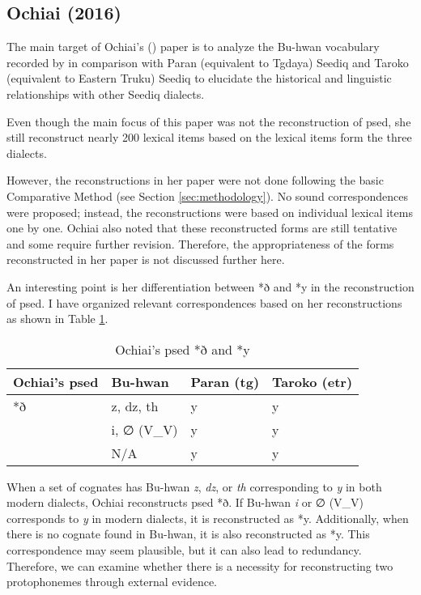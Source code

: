 \subsection{Ochiai (2016)}

The main target of Ochiai's (\citeyear{ochiai2016buhwan}) paper is to analyze the Bu-hwan vocabulary recorded by \textcite{bullock1874formosan} in comparison with Paran (equivalent to Tgdaya) Seediq and Taroko (equivalent to Eastern Truku) Seediq to elucidate the historical and linguistic relationships with other Seediq dialects.

Even though the main focus of this paper was not the reconstruction of \acl{psed}, she still reconstruct nearly 200 lexical items based on the lexical items form the three dialects.

However, the reconstructions in her paper were not done following the basic Comparative Method (see Section \ref{sec:methodology}). No sound correspondences were proposed; instead, the reconstructions were based on individual lexical items one by one. Ochiai also noted that these reconstructed forms are still tentative and some require further revision. Therefore, the appropriateness of the forms reconstructed in her paper is not discussed further here.

An interesting point is her differentiation between *ð and *y in the reconstruction of \acl{psed}. I have organized relevant correspondences based on her reconstructions as shown in Table \ref{tab:ochipsedzy}.

\begin{table}[!htbp]
\centering
\caption{Ochiai's \acl{psed} *ð and *y}
\label{tab:ochipsedzy}
\begin{tabular}{llll}
\hline
Ochiai's \acl{psed} & Bu-hwan    & Paran (\ac{tg}) & Taroko (\ac{etr}) \\ \hline
*ð                  & z, dz, th  & y               & y                 \\ \hdashline
\multirow{2}{*}{*y} & i, ∅ (V\_V) & y               & y                 \\
                    & N/A        & y               & y                 \\ \hline
\end{tabular}
\end{table}

When a set of cognates has Bu-hwan \textit{z}, \textit{dz}, or \textit{th} corresponding to \textit{y} in both modern dialects, Ochiai reconstructs \acl{psed} *ð. If Bu-hwan \textit{i} or ∅ (V\_V) corresponds to \textit{y} in modern dialects, it is reconstructed as *y. Additionally, when there is no cognate found in Bu-hwan, it is also reconstructed as *y. This correspondence may seem plausible, but it can also lead to redundancy. Therefore, we can examine whether there is a necessity for reconstructing two protophonemes through external evidence. 

